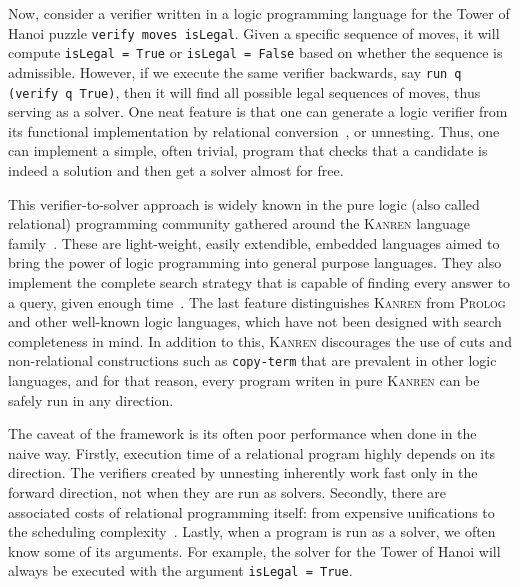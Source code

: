 \documentclass[crop=false]{standalone}
\begin{document}
Now, consider a verifier written in a logic programming language for the Tower of Hanoi puzzle \texttt{verify moves isLegal}. 
Given a specific sequence of moves, it will compute \texttt{isLegal = True} or \texttt{isLegal = False} based on whether the sequence is admissible. 
However, if we execute the same verifier backwards, say \texttt{run q (verify q True)}, then it will find all possible legal sequences of moves, thus serving as a solver. 
One neat feature is that one can generate a logic verifier from its functional implementation by relational conversion~\cite{lozov2018typed}, or unnesting. 
Thus, one can implement a simple, often trivial, program that checks that a candidate is indeed a solution and then get a solver almost for free. 

This verifier-to-solver approach is widely known in the pure logic (also called relational) programming community gathered around the \textsc{Kanren} language family~\cite{TheReasonedSchemer,byrd2017unified}. 
These are light-weight, easily extendible, embedded languages aimed to bring the power of logic programming into general purpose languages. 
They also implement the complete search strategy that is capable of finding every answer to a query, given enough time~\cite{kiselyov2005backtracking}.
The last feature distinguishes \textsc{Kanren} from \textsc{Prolog} and other well-known logic languages, which have not been designed with search completeness in mind. 
In addition to this, \textsc{Kanren} discourages the use of cuts and non-relational constructions such as \texttt{copy-term} that are prevalent in other logic languages, and for that reason, every program writen in pure \textsc{Kanren} can be safely run in any direction. 

The caveat of the framework is its often poor performance when done in the naive way. 
Firstly, execution time  of a relational program highly depends on its direction. 
The verifiers created by unnesting inherently work fast only in the forward direction, not when they are run as solvers. 
Secondly, there are associated costs of relational programming itself: from expensive unifications to the scheduling complexity~\cite{rozplokhas2022scheduling}. 
Lastly, when a program is run as a solver, we often know some of its arguments. 
For example, the solver for the Tower of Hanoi will always be executed with the argument \texttt{isLegal = True}. 
\end{document}
